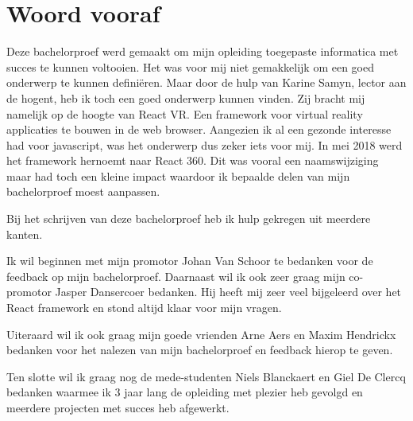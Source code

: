 
\chapter*{Woord vooraf}
\label{ch:voorwoord}


Deze bachelorproef werd gemaakt om mijn opleiding toegepaste informatica met succes te kunnen voltooien. Het was voor mij niet gemakkelijk om een goed onderwerp te kunnen definiëren. Maar door de hulp van Karine Samyn, lector aan de hogent, heb ik toch een goed onderwerp kunnen vinden. Zij bracht mij namelijk op de hoogte van React VR. Een framework voor virtual reality applicaties te bouwen in de web browser. Aangezien ik al een gezonde interesse had voor javascript, was het onderwerp dus zeker iets voor mij. In mei 2018 werd het framework hernoemt naar React 360. Dit was vooral een naamswijziging maar had toch een kleine impact waardoor ik bepaalde delen van mijn bachelorproef moest aanpassen.

Bij het schrijven van deze bachelorproef heb ik hulp gekregen uit meerdere kanten.

Ik wil beginnen met mijn promotor Johan Van Schoor te bedanken voor de feedback op mijn bachelorproef. Daarnaast wil ik ook zeer graag mijn co-promotor Jasper Dansercoer bedanken. Hij heeft mij zeer veel bijgeleerd over het React framework en stond altijd klaar voor mijn vragen.

Uiteraard wil ik ook graag mijn goede vrienden Arne Aers en Maxim Hendrickx bedanken voor het nalezen van mijn bachelorproef en feedback hierop te geven.

Ten slotte wil ik graag nog de mede-studenten  Niels Blanckaert en Giel De Clercq bedanken waarmee ik 3 jaar lang de opleiding met plezier heb gevolgd en meerdere projecten met succes heb afgewerkt.